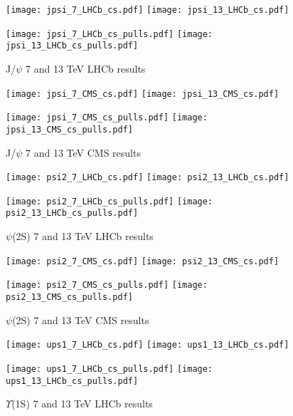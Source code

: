 \documentclass{article}
\begin{document}

\begin{figure}
\centering
\texttt{[image: jpsi\_7\_LHCb\_cs.pdf]}
\texttt{[image: jpsi\_13\_LHCb\_cs.pdf]}

\texttt{[image: jpsi\_7\_LHCb\_cs\_pulls.pdf]}
\texttt{[image: jpsi\_13\_LHCb\_cs\_pulls.pdf]}
\caption{J/$\psi$ 7 and 13 TeV LHCb results}
\end{figure}

\clearpage

\begin{figure}
\centering
\texttt{[image: jpsi\_7\_CMS\_cs.pdf]}
\texttt{[image: jpsi\_13\_CMS\_cs.pdf]}

\texttt{[image: jpsi\_7\_CMS\_cs\_pulls.pdf]}
\texttt{[image: jpsi\_13\_CMS\_cs\_pulls.pdf]}
\caption{J/$\psi$ 7 and 13 TeV CMS results}
\end{figure}

\clearpage

\begin{figure}
\centering
\texttt{[image: psi2\_7\_LHCb\_cs.pdf]}
\texttt{[image: psi2\_13\_LHCb\_cs.pdf]}

\texttt{[image: psi2\_7\_LHCb\_cs\_pulls.pdf]}
\texttt{[image: psi2\_13\_LHCb\_cs\_pulls.pdf]}
\caption{$\psi$(2S) 7 and 13 TeV LHCb results}
\end{figure}

\clearpage

\begin{figure}
\centering
\texttt{[image: psi2\_7\_CMS\_cs.pdf]}
\texttt{[image: psi2\_13\_CMS\_cs.pdf]}

\texttt{[image: psi2\_7\_CMS\_cs\_pulls.pdf]}
\texttt{[image: psi2\_13\_CMS\_cs\_pulls.pdf]}
\caption{$\psi$(2S) 7 and 13 TeV CMS results}
\end{figure}

\clearpage

\begin{figure}
\centering
\texttt{[image: ups1\_7\_LHCb\_cs.pdf]}
\texttt{[image: ups1\_13\_LHCb\_cs.pdf]}

\texttt{[image: ups1\_7\_LHCb\_cs\_pulls.pdf]}
\texttt{[image: ups1\_13\_LHCb\_cs\_pulls.pdf]}
\caption{$\Upsilon$(1S) 7 and 13 TeV LHCb results}
\end{figure}
\end{document}
